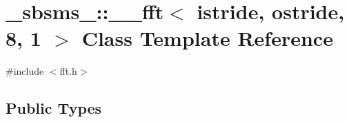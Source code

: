 \hypertarget{class__sbsms___1_1____fft_3_01istride_00_01ostride_00_018_00_011_01_4}{}\section{\+\_\+sbsms\+\_\+\+:\+:\+\_\+\+\_\+fft$<$ istride, ostride, 8, 1 $>$ Class Template Reference}
\label{class__sbsms___1_1____fft_3_01istride_00_01ostride_00_018_00_011_01_4}


{\ttfamily \#include $<$fft.\+h$>$}

\subsection*{Public Types}

